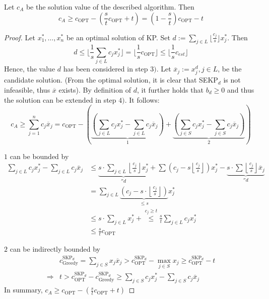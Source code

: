 \begin{thm}\label{thm:thm26.4}
Let $c_A$ be the solution value of the described algorithm. Then 
\[
c_A \geq c_{\text{OPT}} - \left ( \frac{s}{t} c_{\text{OPT}} + t \right ) = (1 - \frac{s}{t}) c_{\text{OPT}} - t
\]
\end{thm}
\begin{proof}
Let $x_1^*, \dots, x_n^*$ be an optimal solution of KP.
Set $d := \sum_{j \in L} \lfloor \frac{c_j}{s} \rfloor x_j^*$.
Then 
\[
	d \leq \lfloor \frac{1}{s} \sum_{j \in L} c_j x_j^* \rfloor = \lfloor \frac{1}{s} c_{\text{OPT}} \rfloor \leq \lfloor \frac{1}{s} c_{est} \rfloor
\]
Hence, the value $d$ has been considered in step $3)$.
Let $\overline{x}_j := x_j^d, j \in L$, be the candidate solution.
(From the optimal solution, it is clear that SEKP$_d$ is not infeasible, thus $\overline{x}$ exists).
By definition of $d$, it further holds that $b_d \geq 0$ and thus the solution can be extended in step $4)$.
It follows:
\[
	c_A \geq \sum_{j=1}^n c_j \overline{x}_j = c_{\text{OPT}} - \left (
	\underbrace{\left ( \sum_{j \in L} c_j x_j^* - \sum_{j \in L} c_j \overline{x}_j \right )}_1 +
	\underbrace{\left ( \sum_{j \in S} c_j x_j^* - \sum_{j \in S} c_j \overline{x}_j \right )}_2
	\right )
\]

$1$ can be bounded by 
\begin{align*}
	\sum_{j \in L} c_j x_j^* - \sum_{j \in L} c_j \overline{x}_j &\leq 
	\underbrace{s \cdot \sum_{j \in L} \left \lfloor \frac{c_j}{s} \right \rfloor x_j^*}_{''d} + \sum \left ( c_j - s \left \lfloor \frac{c_j}{s} \right \rfloor \right )x_j^* - \underbrace{s \cdot \sum \left \lfloor \frac{c_j}{s} \right \rfloor \overline{x}_j}_{''d} \\
	&= \sum_{j \in L} \underbrace{\left (c_j - s \cdot \left \lfloor \frac{c_j}{s} \right \rfloor \right )}_{\leq s} x_j^* \\
	&\leq s \cdot \sum_{j \in L} x_j^* +\stackrel{c_j \geq t}{\leq} \frac{s}{t} \sum_{j \in L} c_j x_j^* \\
	&\leq \frac{s}{t} c_{\text{OPT}}
\end{align*}

$2$ can be indirectly bounded by
\begin{align*}
& c_{\text{Greedy}}^{\text{SKP}_d} = \sum_{j \in S} x_j \overline{x}_j > c_{\text{OPT}}^{\text{SKP}_d} - \max_{j \in S} x_j \geq c_{\text{OPT}}^{\text{SKP}_d} - t \\
\Rightarrow & t > c_{\text{OPT}}^{\text{SKP}_d} - c_{\text{Greedy}}^{\text{SKP}_d} \geq \sum_{j \in S} c_j x_j^* - \sum_{j \in S} c_j \overline{x}_j
\end{align*}
In summary, $c_A \geq c_{\text{OPT}} - \left (\frac{s}{t} c_{\text{OPT}} + t \right )$
\end{proof}

